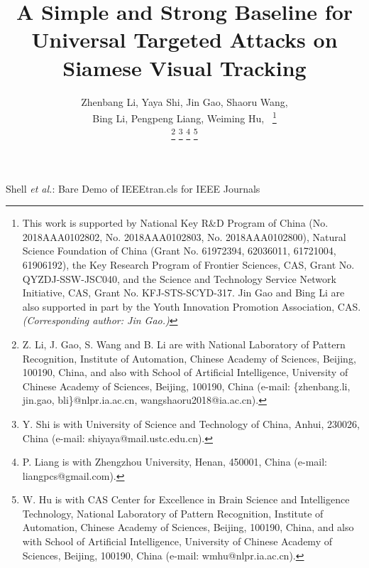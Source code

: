 \documentclass[journal]{IEEEtran}
\begin{document}
\title{A Simple and Strong Baseline for Universal Targeted Attacks on Siamese Visual Tracking}
\author{
  Zhenbang Li, Yaya Shi, Jin Gao, Shaoru Wang,\\ Bing Li, Pengpeng Liang, Weiming Hu,~
  \thanks{This work is supported by National Key R\&D Program of China (No. 2018AAA0102802, No. 2018AAA0102803, No. 2018AAA0102800), Natural Science Foundation of China (Grant No. 61972394, 62036011, 61721004, 61906192), the Key Research Program of Frontier Sciences, CAS, Grant No. QYZDJ-SSW-JSC040, and the Science and Technology Service Network Initiative, CAS, Grant No. KFJ-STS-SCYD-317. Jin Gao and Bing Li are also supported in part by the Youth Innovation Promotion Association, CAS. \textit{(Corresponding author: Jin Gao.)}}
  
  \thanks{Z. Li, J. Gao, S. Wang and B. Li are with National Laboratory of Pattern Recognition, Institute of Automation, Chinese Academy of Sciences, Beijing, 100190, China, and also with School of Artificial Intelligence, University of Chinese Academy of Sciences, Beijing, 100190, China (e-mail: \{zhenbang.li, jin.gao, bli\}@nlpr.ia.ac.cn, wangshaoru2018@ia.ac.cn).}
  \thanks{Y. Shi is with University of Science and Technology of China, Anhui, 230026, China (e-mail: shiyaya@mail.ustc.edu.cn).}
  \thanks{P. Liang is with Zhengzhou University, Henan, 450001, China (e-mail: liangpcs@gmail.com).}
  \thanks{W. Hu is with CAS Center for Excellence in Brain Science and Intelligence Technology, National Laboratory of Pattern Recognition, Institute of Automation, Chinese Academy of Sciences, Beijing, 100190, China, and also with School of Artificial Intelligence, University of Chinese Academy of Sciences, Beijing, 100190, China (e-mail: wmhu@nlpr.ia.ac.cn).}
}

{Shell \MakeLowercase{\textit{et al.}}: Bare Demo of IEEEtran.cls for IEEE Journals}
\maketitle
\end{document}
